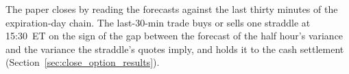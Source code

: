 The paper closes by reading the forecasts against the last thirty minutes of
the expiration-day chain. The last-30-min trade buys or sells one straddle
at 15:30~ET on the sign of the gap between the forecast of the half hour's
variance and the variance the straddle's quotes imply, and holds it to the
cash settlement (Section~\ref{sec:close_option_results}).
